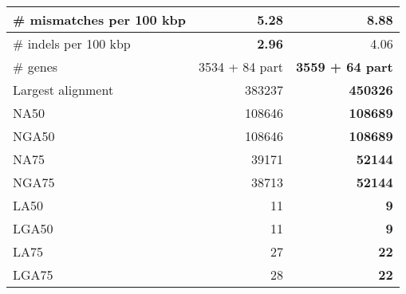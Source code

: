 \documentclass[12pt,a4paper]{article}
\begin{document}
\begin{table}[ht]
\begin{center}
\begin{tabular}{|l*{2}{|r}|}
\# mismatches per 100 kbp & {\bf 5.28} & 8.88 \\ \hline
\# indels per 100 kbp & {\bf 2.96} & 4.06 \\ \hline
\# genes & 3534 + 84 part & {\bf 3559 + 64 part} \\ \hline
Largest alignment & 383237 & {\bf 450326} \\ \hline
NA50 & 108646 & {\bf 108689} \\ \hline
NGA50 & 108646 & {\bf 108689} \\ \hline
NA75 & 39171 & {\bf 52144} \\ \hline
NGA75 & 38713 & {\bf 52144} \\ \hline
LA50 & 11 & {\bf 9} \\ \hline
LGA50 & 11 & {\bf 9} \\ \hline
LA75 & 27 & {\bf 22} \\ \hline
LGA75 & 28 & {\bf 22} \\ \hline
\end{tabular}
\end{center}
\end{table}
\end{document}
